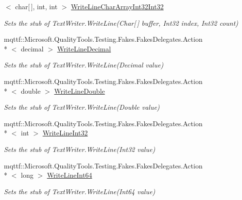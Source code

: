 \begin{DoxyCompactItemize}
$<$ char\mbox{[}$\,$\mbox{]}, int, int $>$ \hyperlink{class_system_1_1_i_o_1_1_fakes_1_1_stub_text_writer_a7fd931eb86cd3c0887fb4a3f8ea921d1}{Write\-Line\-Char\-Array\-Int32\-Int32}
\begin{DoxyCompactList}\small\item\em Sets the stub of Text\-Writer.\-Write\-Line(\-Char\mbox{[}$\,$\mbox{]} buffer, Int32 index, Int32 count)\end{DoxyCompactList}\item 
mqttf\-::\-Microsoft.\-Quality\-Tools.\-Testing.\-Fakes.\-Fakes\-Delegates.\-Action\\*
$<$ decimal $>$ \hyperlink{class_system_1_1_i_o_1_1_fakes_1_1_stub_text_writer_a31631fe1c540c253cdac4d009973f03f}{Write\-Line\-Decimal}
\begin{DoxyCompactList}\small\item\em Sets the stub of Text\-Writer.\-Write\-Line(\-Decimal value)\end{DoxyCompactList}\item 
mqttf\-::\-Microsoft.\-Quality\-Tools.\-Testing.\-Fakes.\-Fakes\-Delegates.\-Action\\*
$<$ double $>$ \hyperlink{class_system_1_1_i_o_1_1_fakes_1_1_stub_text_writer_a5281aa5b23a6ed18ac6ee084a9d1a95c}{Write\-Line\-Double}
\begin{DoxyCompactList}\small\item\em Sets the stub of Text\-Writer.\-Write\-Line(\-Double value)\end{DoxyCompactList}\item 
mqttf\-::\-Microsoft.\-Quality\-Tools.\-Testing.\-Fakes.\-Fakes\-Delegates.\-Action\\*
$<$ int $>$ \hyperlink{class_system_1_1_i_o_1_1_fakes_1_1_stub_text_writer_a9c53af179427d822be50b0b607ebf3d3}{Write\-Line\-Int32}
\begin{DoxyCompactList}\small\item\em Sets the stub of Text\-Writer.\-Write\-Line(\-Int32 value)\end{DoxyCompactList}\item 
mqttf\-::\-Microsoft.\-Quality\-Tools.\-Testing.\-Fakes.\-Fakes\-Delegates.\-Action\\*
$<$ long $>$ \hyperlink{class_system_1_1_i_o_1_1_fakes_1_1_stub_text_writer_a2132dd464ec71a40c9add0e5be560ad0}{Write\-Line\-Int64}
\begin{DoxyCompactList}\small\item\em Sets the stub of Text\-Writer.\-Write\-Line(\-Int64 value)\end{DoxyCompactList}\item 

\end{DoxyCompactItemize}
